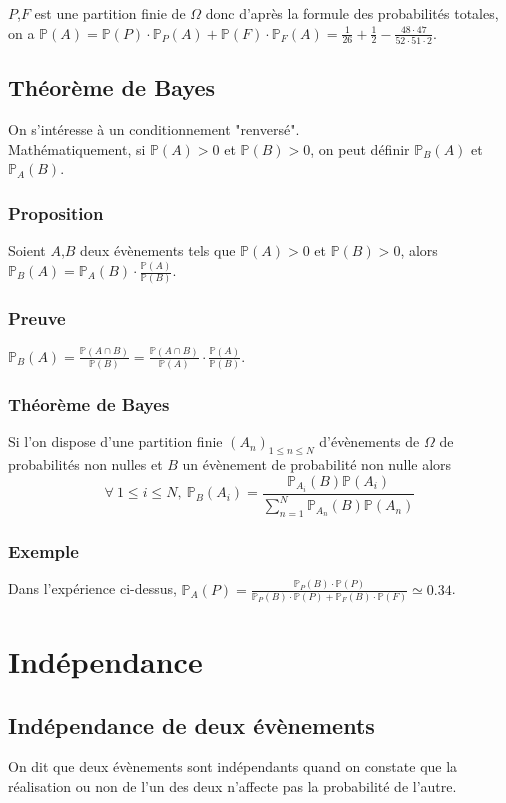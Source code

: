 \documentclass[a4paper,10pt]{book} %
\renewcommand{\P}{\mathbb{P}} %
\begin{document}
$P$,$F$ est une partition finie de $\Omega$ donc d'après la formule des probabilités totales,\\on a $\P(A)=\P(P)\cdot \P_P(A)+\P(F)\cdot \P_F(A)=\frac{1}{26}+\frac{1}{2}-\frac{48\cdot 47}{52\cdot 51\cdot 2}$.

\subsection{Théorème de Bayes}
On s'intéresse à un conditionnement "renversé".\\
Mathématiquement, si $\P(A)>0$ et $\P(B)>0$, on peut définir $\P_B(A)$ et $\P_A(B)$.

\subsubsection{Proposition}\label{proposition1.3.1}
Soient $A$,$B$ deux évènements tels que $\P(A)>0$ et $\P(B)>0$, alors $\P_B(A)=\P_A(B)\cdot \frac{\P(A)}{\P(B)}$.

\subsubsection{Preuve}
$\P_B(A)=\frac{\P(A\cap B)}{\P(B)}=\frac{\P(A\cap B)}{\P(A)}\cdot \frac{\P(A)}{\P(B)}$.

\subsubsection{Théorème de Bayes}
Si l'on dispose d'une partition finie $(A_n)_{1\leq n\leq N}$ d'évènements de $\Omega$ de probabilités non nulles et $B$ un évènement de probabilité non nulle alors
$$\forall ~1\leq i\leq N,~ \P_B(A_i)=\frac{\P_{A_i}(B)\P(A_i)}{\sum_{n=1}^N\P_{A_n}(B)\P(A_n)}$$

\subsubsection{Exemple}
Dans l'expérience ci-dessus, $\P_{A}(P)=\frac{\P_P(B)\cdot \P(P)}{\P_P(B)\cdot \P(P)+\P_F(B)\cdot \P(F)}\simeq 0.34$.

\section{Indépendance}
\subsection{Indépendance de deux évènements}
On dit que deux évènements sont indépendants quand on constate que la réalisation ou non de l'un des deux n'affecte pas la probabilité de l'autre.
\end{document}
